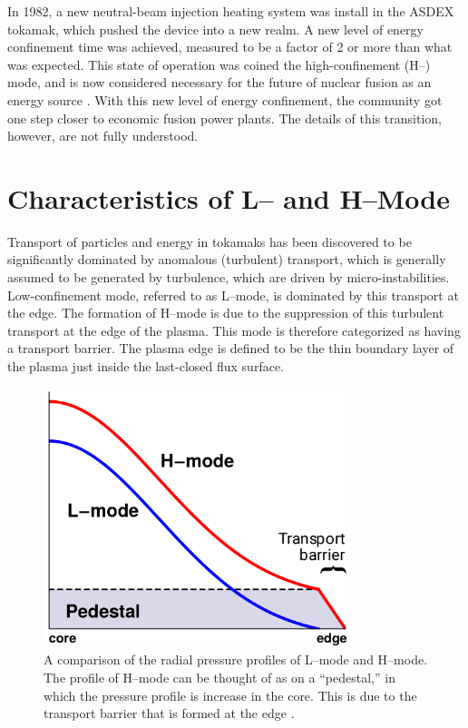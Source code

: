 In 1982, a new neutral-beam injection heating system was install in the ASDEX tokamak, which pushed the device into a new realm.
A new level of energy confinement time was achieved, measured to be a factor of 2 or more than what was expected.
This state of operation was coined the high-confinement (H--) mode, and is now considered necessary for the future of nuclear fusion as an energy source \cite{arnoux_how_2009} \cite{wagner_development_1984}.
With this new level of energy confinement, the community got one step closer to economic fusion power plants.
The details of this transition, however, are not fully understood.

\section{Characteristics of L-- and H--Mode}\label{sec:characteristics}
Transport of particles and energy in tokamaks has been discovered to be significantly dominated by anomalous (turbulent) transport, which is generally assumed to be generated by turbulence, which are driven by micro-instabilities.
Low-confinement mode, referred to as L--mode, is dominated by this transport at the edge.
The formation of H--mode is due to the suppression of this turbulent transport at the edge of the plasma.
This mode is therefore categorized as having a transport barrier.
The plasma edge is defined to be the thin boundary layer of the plasma just inside the last-closed flux surface.

\begin{figure}[tb] %
\begin{minipage}{0.49\linewidth}
	\centering
	\includegraphics[width=0.8\textwidth]{../Graphics/L-mode_H-mode_compare.png}
\end{minipage}
\hfill
\begin{minipage}{0.49\linewidth}
	\caption{A comparison of the radial pressure profiles of L--mode and H--mode.
	The profile of H--mode can be thought of as on a ``pedestal,'' in which the pressure profile is increase in the core.
	This is due to the transport barrier that is formed at the edge \cite{weymiens_bifurcation_2014}.}
	\label{fig:L-mode_H-mode_compare}
\end{minipage}
\end{figure}

